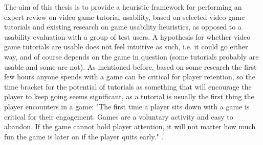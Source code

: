 The aim of this thesis is to provide a heuristic framework for performing an expert review on video game tutorial usability, based on selected video game tutorials and existing research on game usability heuristics, as opposed to a usability evaluation with a group of test users. A hypothesis for whether video game tutorials are usable does not feel intuitive as such, i.e. it could go either way, and of course depends on the game in question (some tutorials probably are usable and some are not). As mentioned before, based on some research the first few hours anyone spends with a game can be critical for player retention, so the time bracket for the potential of tutorials as something that will encourage the player to keep going seems significant, as a tutorial is usually the first thing the player encounters in a game: "The first time a player sits down with a game is critical for their engagement. Games are a voluntary activity and easy to abandon. If the game cannot hold player attention, it will not matter how much fun the game is later on if the player quits early." \cite{Cheung2014}.